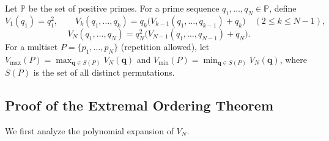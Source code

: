 \documentclass[12pt]{article}
\theoremstyle{plain}
\theoremstyle{definition}
\theoremstyle{remark}
\begin{document}
Let $\mathbb{P}$ be the set of positive primes. For a prime sequence $q_1,\dots,q_N\in\mathbb{P}$, define
\[
V_1(q_1)=q_1^2,\qquad 
V_k(q_1,\dots,q_k)=q_k\bigl(V_{k-1}(q_1,\dots,q_{k-1})+q_k\bigr)\quad(2\le k\le N-1),
\]
\[
V_N(q_1,\dots,q_N)=q_N^2\bigl(V_{N-1}(q_1,\dots,q_{N-1})+q_N\bigr).
\]
For a multiset $P=\{p_1,\dots,p_N\}$ (repetition allowed), let $V_{\max}(P)=\max_{\mathbf{q}\in S(P)} V_N(\mathbf{q})$ and $V_{\min}(P)=\min_{\mathbf{q}\in S(P)} V_N(\mathbf{q})$, where $S(P)$ is the set of all distinct permutations.

\subsection{Proof of the Extremal Ordering Theorem}

We first analyze the polynomial expansion of $V_N$.
\end{document}
